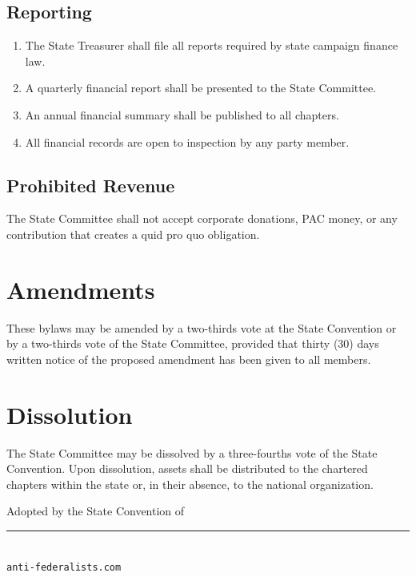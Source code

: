 \documentclass[11pt, letterpaper]{article}
\begin{document}
\subsection{Reporting}
\begin{enumerate}
  \item The State Treasurer shall file all reports required by state campaign finance law.
  \item A quarterly financial report shall be presented to the State Committee.
  \item An annual financial summary shall be published to all chapters.
  \item All financial records are open to inspection by any party member.
\end{enumerate}

\subsection{Prohibited Revenue}
The State Committee shall not accept corporate donations, PAC money, or any contribution that creates a quid pro quo obligation.

\section{Amendments}

These bylaws may be amended by a two-thirds vote at the State Convention or by a two-thirds vote of the State Committee, provided that thirty (30) days written notice of the proposed amendment has been given to all members.

\section{Dissolution}

The State Committee may be dissolved by a three-fourths vote of the State Convention. Upon dissolution, assets shall be distributed to the chartered chapters within the state or, in their absence, to the national organization.

\newpage


\vspace{2.5cm}



\vspace{2cm}

\begin{center}
  {\small\color{afp-gray}\sffamily
    Adopted by the State Convention of \rule{4cm}{0.4pt}\\[0.5em]
    \texttt{anti-federalists.com}
  }
\end{center}
\end{document}
